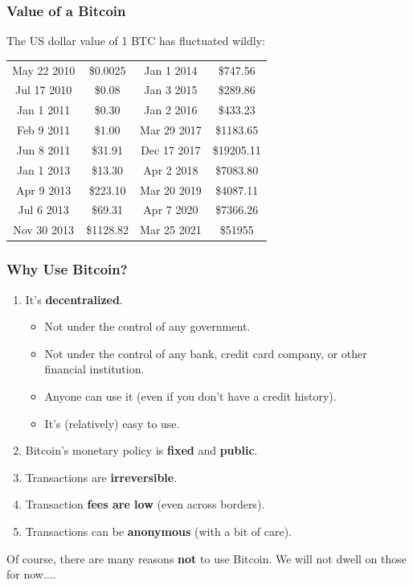 \documentclass[12pt,titlepage]{article}
\begin{document}
\subsubsection{Value of a Bitcoin}
The US dollar value of 1 BTC has fluctuated wildly:
\begin{center}
	\begin{tabular}{|cc|cc|}
		\hline
		May 22 2010 & \$0.0025 & Jan 1 2014 & \$747.56\\
		Jul 17 2010 & \$0.08 & Jan 3 2015 & \$289.86\\
		Jan 1 2011 & \$0.30 & Jan 2 2016 & \$433.23\\
		Feb 9 2011 & \$1.00 & Mar 29 2017 & \$1183.65\\
		Jun 8 2011 & \$31.91 & Dec 17 2017 & \$19205.11\\
		Jan 1 2013 & \$13.30 & Apr 2 2018 & \$7083.80\\
		Apr 9 2013 & \$223.10 & Mar 20 2019 & \$4087.11\\
		Jul 6 2013 & \$69.31 & Apr 7 2020 & \$7366.26\\
		Nov 30 2013 & \$1128.82 & Mar 25 2021 & \$51955\\ 
		\hline
	\end{tabular}
\end{center}
\subsubsection{Why Use Bitcoin?}
\begin{enumerate}
	\item It’s \textbf{decentralized}.\begin{itemize}
		\item Not under the control of any government.
		\item Not under the control of any bank, credit card company, or other financial institution.
		\item Anyone can use it (even if you don’t have a credit history).
		\item It’s (relatively) easy to use.
	\end{itemize}
	\item Bitcoin’s monetary policy is \textbf{fixed} and \textbf{public}.
	\item Transactions are \textbf{irreversible}.
	\item Transaction \textbf{fees are low} (even across borders).
	\item Transactions can be \textbf{anonymous} (with a bit of care).
\end{enumerate}
Of course, there are many reasons \textbf{not} to use Bitcoin. We will not dwell on those for now....
\end{document}
